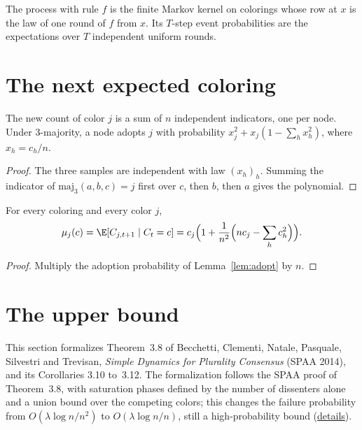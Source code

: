 \begin{definition}\label{def:kernel}
  \leanok
  The process with rule $f$ is the finite Markov kernel on colorings whose
  row at $x$ is the law of one round of $f$ from $x$. Its $T$-step event
  probabilities are the expectations over $T$ independent uniform rounds.
\end{definition}

\section{The next expected coloring}\label{sec:expected}

\begin{lemma}\label{lem:adopt}
  \leanok
  The new count of color $j$ is a sum of $n$ independent indicators, one per
  node. Under 3-majority, a node adopts $j$ with probability
  $x_j^2 + x_j(1 - \sum_h x_h^2)$, where $x_h = c_h/n$.
\end{lemma}

\begin{proof}
  The three samples are independent with law $(x_h)_h$. Summing the
  indicator of $\mathrm{maj}_3(a,b,c) = j$ first over $c$, then $b$, then $a$
  gives the polynomial.
\end{proof}

\begin{lemma}\label{lem:2_1}
  \leanok
  For every coloring and every color $j$,
  \[
    \mu_j(c) = \E[C_{j,t+1} \mid C_t = c]
      = c_j\Bigl(1 + \frac{1}{n^2}\Bigl(n c_j - \sum_h c_h^2\Bigr)\Bigr).
  \]
\end{lemma}

\begin{proof}
  Multiply the adoption probability of Lemma~\ref{lem:adopt} by $n$.
\end{proof}

\section{The upper bound}\label{sec:upper}

This section formalizes Theorem~3.8 of Becchetti, Clementi, Natale, Pasquale, Silvestri and
Trevisan, \emph{Simple Dynamics for Plurality Consensus} (SPAA 2014), and its Corollaries 3.10
to~3.12. The formalization follows the SPAA proof of Theorem~3.8, with saturation phases defined
by the number of dissenters alone and a union bound over the competing colors; this changes the
failure probability from $O(\lambda\log n/n^2)$ to $O(\lambda\log n/n)$, still a
high-probability bound
(\href{https://github.com/formal-dynamics/leanamics/blob/main/plurality/FORMALIZATION_DIFFERENCES.md#1-theorem-38-how-the-lean-proof-differs-from-spaa}{details}).

